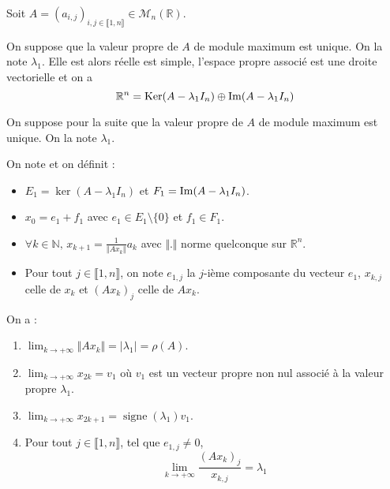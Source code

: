 	Soit $A = (a_{i,j})_{i, j \in \llbracket 1, n \rrbracket} \in \mathcal{M}_n(\mathbb{R})$.
	
	
	\begin{theorem}
		On suppose que la valeur propre de $A$ de module maximum est unique. On la note $\lambda_1$. Elle est alors réelle est simple, l'espace propre associé est une droite vectorielle et on a
		\[ \mathbb{R}^n = \mathrm{Ker}(A-\lambda_1 I_n) \oplus \mathrm{Im}(A-\lambda_1 I_n) \]
	\end{theorem}
	
	On suppose pour la suite que la valeur propre de $A$ de module maximum est unique. On la note $\lambda_1$.
	
	\begin{notation}
		On note et on définit :
		\begin{itemize}
			\item $E_1 = \ker(A-\lambda_1 I_n)$ et $F_1 = \mathrm{Im}(A-\lambda_1 I_n)$.
			\item $x_0 = e_1 + f_1$ avec $e_1 \in E_1 \setminus \{ 0 \}$ et $f_1 \in F_1$.
			\item $\forall k \in \mathbb{N}, \, x_{k+1} = \frac{1}{\Vert A x_k \Vert} a_k$ avec $\Vert . \Vert$ norme quelconque sur $\mathbb{R}^n$.
			\item Pour tout $j \in \llbracket 1,n \rrbracket$, on note $e_{1,j}$ la $j$-ième composante du vecteur $e_1$, $x_{k,j}$ celle de $x_k$ et $(Ax_k)_j$ celle de $Ax_k$.
		\end{itemize}
	\end{notation}
	
	\begin{theorem}
		On a :
		\begin{enumerate}[label=(\roman*)]
			\item $\lim_{k \rightarrow +\infty} \Vert A x_k \Vert = \vert \lambda_1 \vert = \rho(A)$.
			\item $\lim_{k \rightarrow +\infty} x_{2k} = v_1$ où $v_1$ est un vecteur propre non nul associé à la valeur propre $\lambda_1$.
			\item $\lim_{k \rightarrow +\infty} x_{2k+1} = \operatorname{signe}(\lambda_1) v_1$.
			\item Pour tout $j \in \llbracket 1,n \rrbracket$, tel que $e_{1,j} \neq 0$,
			\[ \lim_{k \rightarrow +\infty} \frac{(A x_k)_j}{x_{k,j}} = \lambda_1 \]
		\end{enumerate}
	\end{theorem}
	
